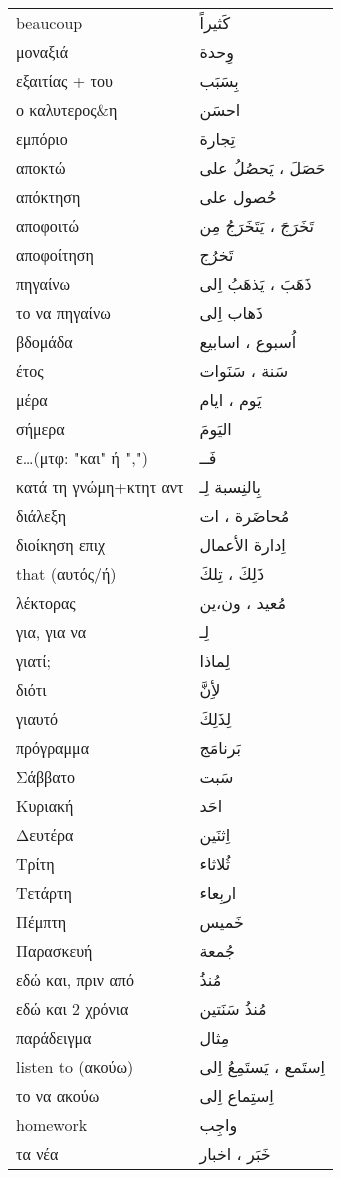 \documentclass[twocolumn,a4paper]{article}
\newcommand{\ar}[1]{\textarabic{#1}}
\newcommand{\pl}{\raisebox{0.15ex}{\footnotesize ◍}}
\newcommand{\normpl}[1]{\ar{ #1، ات }}
\newcommand{\mfnormpl}[1]{\ar{ #1، ون،ين }}
\newcommand{\vrf}{\raisebox{0.15ex}{\footnotesize ◉}}
\newcommand{\mas}{\raisebox{0.15ex}{\footnotesize ◫}}
\begin{document}
\begin{mpsupertabular}{ P{0.5\textwidth} P{0.5\textwidth} }
beaucoup       & \ar{ كَثيراً } \\
μοναξιά        & \ar{ وِحدة } \\
εξαιτίας + του & \ar{ بِسَبَب } \\
ο καλυτερος\&η & \ar{ احسَن } \\
εμπόριο        & \ar{ تِجارة } \\
αποκτώ \vrf    & \ar{ حَصَلَ ، يَحصُلُ على } \\
απόκτηση       & \ar{ حُصول على } \\
αποφοιτώ \vrf  & \ar{ تَخَرَجَ ، يَتَخَرَجُ مِن } \\
αποφοίτηση \mas & \ar{ تَخرُج } \\
πηγαίνω \vrf   & \ar{ ذَهَبَ ، يَذهَبُ اِلى } \\
το να πηγαίνω \mas & \ar{ ذَهاب اِلى } \\
βδομάδα \pl    & \ar{ اُسبوع ، اسابيع } \\
έτος \pl       & \ar{ سَنة ، سَنَوات } \\
μέρα \pl       & \ar{ يَوم ، ايام } \\
σήμερα         & \ar{ اليَومَ } \\
ε\ldots (μτφ: "και" ή ",") & \ar{ فَــ } \\
κατά τη γνώμη+κτητ αντ & \ar{ بِالنِسبة لِـ } \\
διάλεξη \pl    & \normpl{ مُحاضَرة } \\
διοίκηση επιχ  & \ar{ اِدارة اﻷعمال } \\
that (αυτός/ή) & \ar{ ذَلِكَ ، تِلكَ } \\
λέκτορας \pl   & \mfnormpl{ مُعيد } \\
για, για να     & \ar{ لِـ } \\
γιατί;         & \ar{ لِماذا } \\
διότι          & \ar{ ﻷِنَّ } \\  %
γιαυτό         & \ar{ لِذَلِكَ } \\
πρόγραμμα      & \ar{ بَرنامَج } \\
Σάββατο        & \ar{ سَبت } \\
Κυριακή        & \ar{ احَد } \\
Δευτέρα        & \ar{ اِثنَين } \\
Τρίτη          & \ar{ ثُلاثاء } \\
Τετάρτη        & \ar{ اربِعاء } \\
Πέμπτη         & \ar{ خَميس } \\
Παρασκευή      & \ar{ جُمعة } \\
εδώ και, πριν από & \ar{ مُنذُ } \\
εδώ και 2 χρόνια & \ar{ مُنذُ سَنَتين } \\
παράδειγμα     & \ar{ مِثال } \\
listen to (ακούω) \vrf & \ar{ اِستَمع ، يَستَمِعُ اِلى } \\
το να ακούω \mas & \ar{ اِستِماع اِلى  } \\
homework       & \ar{ واجِب } \\
τα νέα \pl     & \ar{ خَبَر ، اخبار } \\


\end{mpsupertabular}
\end{document}
